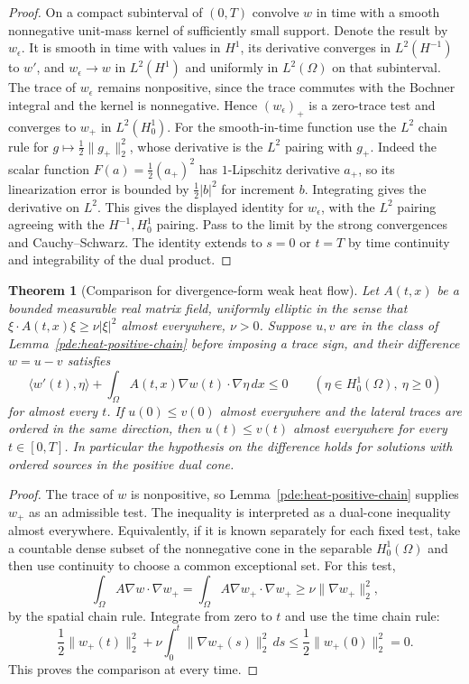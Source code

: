 \documentclass[11pt,oneside,openany]{book}
\theoremstyle{plain}
\newtheorem{theorem}{Theorem}[chapter]
\theoremstyle{definition}
\theoremstyle{remark}
\begin{document}
\begin{proof}
On a compact subinterval of \((0,T)\) convolve \(w\) in time
with a smooth nonnegative unit-mass kernel of sufficiently
small support. Denote the result by \(w_\epsilon\).
It is smooth in time with values in \(H^1\),
its derivative converges in \(L^2(H^{-1})\) to \(w'\),
and \(w_\epsilon\to w\) in \(L^2(H^1)\) and uniformly in
\(L^2(\Omega)\) on that subinterval.
The trace of \(w_\epsilon\) remains nonpositive, since the
trace commutes with the Bochner integral and the kernel is
nonnegative. Hence \((w_\epsilon)_+\) is a zero-trace test
and converges to \(w_+\) in \(L^2(H^1_0)\).
For the smooth-in-time function use the \(L^2\) chain rule
for \(g\mapsto\frac12\|g_+\|_2^2\), whose derivative is
the \(L^2\) pairing with \(g_+\).
Indeed the scalar function \(F(a)=\frac12(a_+)^2\) has
\(1\)-Lipschitz derivative \(a_+\), so its linearization error
is bounded by \(\frac12|b|^2\) for increment \(b\).
Integrating gives the derivative on \(L^2\).
This gives the displayed identity for \(w_\epsilon\), with
the \(L^2\) pairing agreeing with the \(H^{-1},H^1_0\) pairing.
Pass to the limit by the strong convergences and Cauchy--Schwarz.
The identity extends to \(s=0\) or \(t=T\) by time continuity
and integrability of the dual product.
\end{proof}

\begin{theorem}[Comparison for divergence-form weak heat flow]
\label{pde:heat-weak-comparison}
Let \(A(t,x)\) be a bounded measurable real matrix field,
uniformly elliptic in the sense that
\(\xi\cdot A(t,x)\xi\geq\nu|\xi|^2\) almost everywhere,
\(\nu>0\). Suppose \(u,v\) are in the class of
Lemma~\ref{pde:heat-positive-chain} before imposing a trace sign,
and their difference \(w=u-v\) satisfies
\[
 \langle w'(t),\eta\rangle+
       \int_\Omega A(t,x)\nabla w(t)\cdot\nabla\eta\,dx\leq0
 \qquad(\eta\in H^1_0(\Omega),\ \eta\geq0)
\]
for almost every \(t\). If \(u(0)\leq v(0)\) almost everywhere
and the lateral traces are ordered in the same direction, then
\(u(t)\leq v(t)\) almost everywhere for every \(t\in[0,T]\).
In particular the hypothesis on the difference holds for
solutions with ordered sources in the positive dual cone.
\end{theorem}

\begin{proof}
The trace of \(w\) is nonpositive, so
Lemma~\ref{pde:heat-positive-chain} supplies \(w_+\) as an
admissible test. The inequality is interpreted as a dual-cone
inequality almost everywhere. Equivalently, if it is known
separately for each fixed test, take a countable dense subset
of the nonnegative cone in the separable \(H^1_0(\Omega)\)
and then use continuity to choose a common exceptional set.
For this test,
\[
 \int_\Omega A\nabla w\cdot\nabla w_+
    =\int_\Omega A\nabla w_+\cdot\nabla w_+
    \geq\nu\|\nabla w_+\|_2^2,
\]
by the spatial chain rule. Integrate from zero to \(t\) and
use the time chain rule:
\[
 \frac12\|w_+(t)\|_2^2+
    \nu\int_0^t\|\nabla w_+(s)\|_2^2\,ds
 \leq \frac12\|w_+(0)\|_2^2=0 .
\]
This proves the comparison at every time.
\end{proof}
\end{document}
